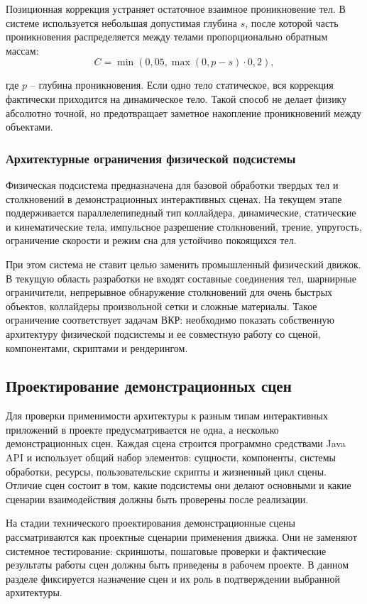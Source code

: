 Позиционная коррекция устраняет остаточное взаимное проникновение тел. В
системе используется небольшая допустимая глубина \(s\), после которой часть
проникновения распределяется между телами пропорционально обратным массам:
\[
C=\min(0{,}05,\max(0,p-s)\cdot 0{,}2),
\]

где \(p\) -- глубина проникновения. Если одно тело статическое, вся коррекция
фактически приходится на динамическое тело. Такой способ не делает физику
абсолютно точной, но предотвращает заметное накопление проникновений между
объектами.

\subsubsection{Архитектурные ограничения физической подсистемы}

Физическая подсистема предназначена для базовой обработки твердых тел и
столкновений в демонстрационных интерактивных сценах. На текущем этапе
поддерживается параллелепипедный тип коллайдера, динамические, статические и
кинематические тела, импульсное разрешение столкновений, трение, упругость,
ограничение скорости и режим сна для устойчиво покоящихся тел.

При этом система не ставит целью заменить промышленный физический движок. В
текущую область разработки не входят составные соединения тел, шарнирные
ограничители, непрерывное обнаружение столкновений для очень быстрых объектов,
коллайдеры произвольной сетки и сложные материалы. Такое ограничение соответствует
задачам ВКР: необходимо показать собственную архитектуру физической подсистемы
и ее совместную работу со сценой, компонентами, скриптами и рендерингом.


\subsection{Проектирование демонстрационных сцен}

Для проверки применимости архитектуры к разным типам интерактивных приложений
в проекте предусматривается не одна, а несколько демонстрационных сцен. Каждая
сцена строится программно средствами Java API и использует общий набор элементов:
сущности, компоненты, системы обработки, ресурсы, пользовательские скрипты и
жизненный цикл сцены. Отличие сцен состоит в том, какие подсистемы они делают
основными и какие сценарии взаимодействия должны быть проверены после реализации.

На стадии технического проектирования демонстрационные сцены рассматриваются как
проектные сценарии применения движка. Они не заменяют системное тестирование:
скриншоты, пошаговые проверки и фактические результаты работы сцен должны быть
приведены в рабочем проекте. В данном разделе фиксируется назначение сцен и их
роль в подтверждении выбранной архитектуры.

